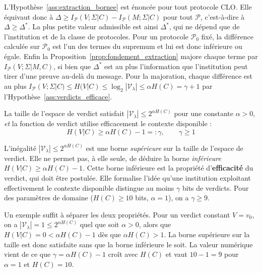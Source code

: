 \begin{sloppypar}
\begin{Preuve}
L'Hypoth\`ese~\ref{ass:extraction_bornee} est \'enonc\'ee pour tout protocole CLO. Elle
\'equivaut donc \`a
$\Delta \geq I_{\mathcal{P}}(V;\Sigma|C) - I_{\mathcal{P}}(M;\Sigma|C)$ pour tout $\mathcal{P}$,
c'est-\`a-dire \`a $\Delta \geq \Delta^*$. La plus petite valeur admissible est ainsi
$\Delta^*$, qui ne d\'epend que de l'institution et de la classe de protocoles. Pour
un protocole $\mathcal{P}_0$ fix\'e, la diff\'erence calcul\'ee sur $\mathcal{P}_0$ est l'un
des termes du supremum et lui est donc inf\'erieure ou \'egale. Enfin la
Proposition~\ref{prop:fondement_extraction} majore chaque terme par
$I_{\mathcal{P}}(V;\Sigma|M,C)$, si bien que $\Delta^*$ est au plus l'information que
l'institution peut tirer d'une preuve au-del\`a du message. Pour la majoration, chaque
diff\'erence est au plus $I_{\mathcal{P}}(V;\Sigma|C) \leq H(V|C) \leq \log_2|\mathcal{V}_\lambda|
\leq \alpha H(C) = \gamma + 1$ par l'Hypoth\`ese~\ref{ass:verdicts_efficace}.
\end{Preuve}

\begin{assumption}
\label{ass:verdicts_efficace}
La taille de l'espace de verdict satisfait $|\mathcal{V}_\lambda| \leq
2^{\alpha H(C)}$ pour une constante $\alpha > 0$, \emph{et} la fonction
de verdict utilise efficacement le contexte disponible :
\begin{equation}
H(V|C) \geq \alpha H(C) - 1 =: \gamma, \qquad \gamma \geq 1
\label{eq:verdicts_efficace}
\end{equation}
\end{assumption}

\begin{remark}
\label{rem:statut_verdict_efficace}
L'in\'egalit\'e $|\mathcal{V}_\lambda| \leq 2^{\alpha H(C)}$ est une
borne \emph{sup\'erieure} sur la taille de l'espace de verdict. Elle ne
permet pas, \`a elle seule, de d\'eduire la borne \emph{inf\'erieure}
$H(V|C) \geq \alpha H(C) - 1$. Cette borne inf\'erieure est la
propri\'et\'e d'\textbf{efficacit\'e} du verdict, qui doit \^etre
postul\'ee. Elle formalise l'id\'ee qu'une institution
exploitant effectivement le contexte disponible distingue au moins
$\gamma$ bits de verdicts. Pour des param\`etres de domaine
($H(C) \geq 10$ bits, $\alpha = 1$), on a $\gamma \geq 9$.
\end{remark}

\begin{Preuve}
Un exemple suffit \`a s\'eparer les deux propri\'et\'es. Pour un verdict constant
$V = v_0$, on a $|\mathcal{V}_\lambda| = 1 \leq 2^{\alpha H(C)}$ quel que soit
$\alpha > 0$, alors que $H(V|C) = 0 < \alpha H(C) - 1$ d\`es que $\alpha H(C) > 1$.
La borne sup\'erieure sur la taille est donc satisfaite sans que la borne
inf\'erieure le soit. La valeur num\'erique vient de ce que
$\gamma = \alpha H(C) - 1$ cro\^it avec $H(C)$ et vaut $10 - 1 = 9$ pour
$\alpha = 1$ et $H(C) = 10$.
\end{Preuve}


\end{sloppypar}
